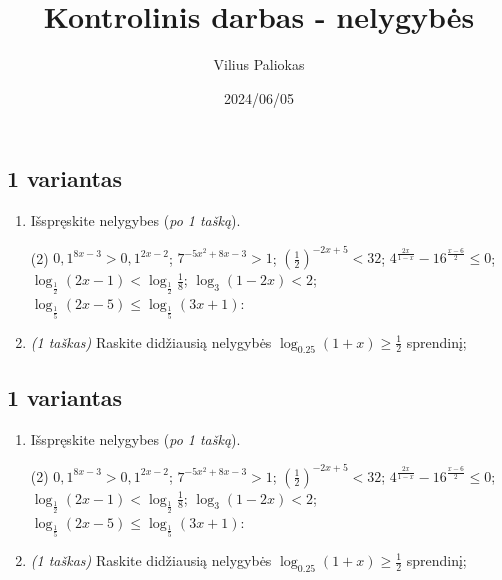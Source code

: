 \documentclass[a4paper]{article}
\title{Kontrolinis darbas - nelygybės}
\author{Vilius Paliokas}
\date{2024/06/05}
\begin{document}
\thispagestyle{fancy}

\titlespacing*{\subsection}{0pt}{.75ex}{0.75ex}

\subsection*{1 variantas}

\begin{enumerate}
      \item Išspręskite nelygybes (\textit{po 1 tašką}).

            \begin{tasks}[item-format={\normalfont}, after-item-skip=2mm](2)
                  \task $0,1^{8x-3}>0,1^{2x-2}$;
                  \task $7^{-5x^2+8x-3}>1$;
                  \task $(\frac{1}{2})^{-2x+5}<32$;
                  \task $4^{\frac{2x}{1-x}}-16^{\frac{x-6}{2}} \leqslant 0$;
                  \task $\log_{\frac{1}{2}}(2x-1)<\log_{\frac{1}{2}}\frac{1}{8}$;
                  \task $\log_{3}(1-2x)<2$;
                  \task $\log_{\frac{1}{5}}(2x-5) \leqslant \log_{\frac{1}{5}}(3x+1)$:
            \end{tasks}

      \item \textit{(1 taškas)} Raskite didžiausią nelygybės $\log_{0.25}(1+x) \geqslant \frac{1}{2}$ sprendinį;

\end{enumerate}

\vspace*{6mm}

\subsection*{1 variantas}

\begin{enumerate}
      \item Išspręskite nelygybes (\textit{po 1 tašką}).

            \begin{tasks}[item-format={\normalfont}, after-item-skip=2mm](2)
                  \task $0,1^{8x-3}>0,1^{2x-2}$;
                  \task $7^{-5x^2+8x-3}>1$;
                  \task $(\frac{1}{2})^{-2x+5}<32$;
                  \task $4^{\frac{2x}{1-x}}-16^{\frac{x-6}{2}} \leqslant 0$;
                  \task $\log_{\frac{1}{2}}(2x-1)<\log_{\frac{1}{2}}\frac{1}{8}$;
                  \task $\log_{3}(1-2x)<2$;
                  \task $\log_{\frac{1}{5}}(2x-5) \leqslant \log_{\frac{1}{5}}(3x+1)$:
            \end{tasks}

      \item \textit{(1 taškas)} Raskite didžiausią nelygybės $\log_{0.25}(1+x) \geqslant \frac{1}{2}$ sprendinį;

\end{enumerate}
\end{document}
